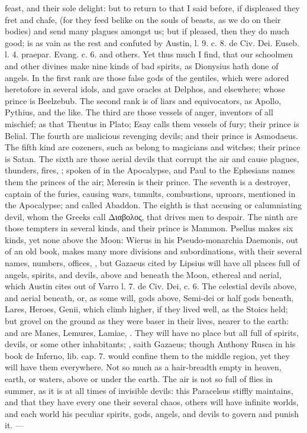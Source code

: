 {{feast, and their sole delight: but to return to that I said before, if
displeased they fret and chafe, (for they feed belike on the souls of
beasts, as we do on their bodies) and send many plagues amongst us; but
if pleased, then they do much good; is as vain as the rest and confuted
by Austin, l. 9. c. 8. de Civ. Dei. Euseb. l. 4. praepar. Evang. c. 6.
and others. Yet thus much I find, that our schoolmen and other
divines make nine kinds of bad spirits, as Dionysius hath done of
angels. In the first rank are those false gods of the gentiles, which
were adored heretofore in several idols, and gave oracles at Delphos,
and elsewhere; whose prince is Beelzebub. The second rank is of liars
and equivocators, as Apollo, Pythius, and the like. The third are those
vessels of anger, inventors of all mischief; as that Theutus in Plato;
Esay calls them vessels of fury; their prince is Belial. The
fourth are malicious revenging devils; and their prince is Asmodaeus.
The fifth kind are cozeners, such as belong to magicians and witches;
their prince is Satan. The sixth are those aerial devils that
corrupt the air and cause plagues, thunders, fires, \etc{}; spoken
of in the Apocalypse, and Paul to the Ephesians names them the princes
of the air; Meresin is their prince. The seventh is a destroyer,
captain of the furies, causing wars, tumults, combustions, uproars,
mentioned in the Apocalypse; and called Abaddon. The eighth is that
accusing or calumniating devil, whom the Greeks call \textgreek{Διαβολος}, that
drives men to despair. The ninth are those tempters in several kinds,
and their prince is Mammon. Psellus makes six kinds, yet none above the
Moon: Wierus in his Pseudo-monarchia Daemonis, out of an old book,
makes many more divisions and subordinations, with their several names,
numbers, offices, \etc{}, but Gazaeus cited by Lipsius will have all
places full of angels, spirits, and devils, above and beneath the
Moon, ethereal and aerial, which Austin cites out of Varro l. 7.
de Civ. Dei, c. 6. The celestial devils above, and aerial beneath, or,
as some will, gods above, Semi-dei or half gods beneath, Lares, Heroes,
Genii, which climb higher, if they lived well, as the Stoics held; but
grovel on the ground as they were baser in their lives, nearer to the
earth: and are Manes, Lemures, Lamiae, \etc{}. They will have no
place but all full of spirits, devils, or some other inhabitants;
, saith
Gazaeus; though Anthony Rusca in his book de Inferno, lib. 
cap. 7. would confine them to the middle region, yet they will have
them everywhere. Not so much as a hair-breadth empty in heaven, earth,
or waters, above or under the earth. The air is not so full of flies in
summer, as it is at all times of invisible devils: this
Paracelsus stiffly maintains, and that they have every one their
several chaos, others will have infinite worlds, and each world his
peculiar spirits, gods, angels, and devils to govern and punish it.
---

}}
